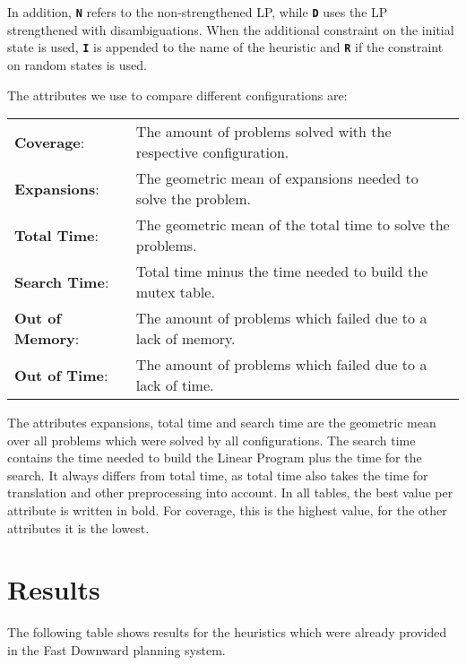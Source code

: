 In addition, \textbf{\texttt{N}} refers to the non-strengthened LP, while \textbf{\texttt{D}} uses the LP strengthened with disambiguations.
When the additional constraint on the initial state is used, \textbf{\texttt{I}} is appended to the name of the heuristic and \textbf{\texttt{R}} if the constraint on random states is used.

The attributes we use to compare different configurations are:

\begin{center}
    \begin{tabularx}{\textwidth}{@{}lX@{}}
        \textbf{Coverage}: & The amount of problems solved with the respective configuration. \\
        \textbf{Expansions}: & The geometric mean of expansions needed to solve the problem. \\
        \textbf{Total Time}: & The geometric mean of the total time to solve the problems. \\
        \textbf{Search Time}: & Total time minus the time needed to build the mutex table. \\
        \textbf{Out of Memory}: & The amount of problems which failed due to a lack of memory. \\
        \textbf{Out of Time}: & The amount of problems which failed due to a lack of time. \\
    \end{tabularx}
\end{center}

The attributes expansions, total time and search time are the geometric mean over all problems which were solved by all configurations.
The search time contains the time needed to build the Linear Program plus the time for the search.
It always differs from total time, as total time also takes the time for translation and other preprocessing into account.
In all tables, the best value per attribute is written in bold.
For coverage, this is the highest value, for the other attributes it is the lowest.

\section{Results}\label{sec:results}
The following table shows results for the heuristics which were already provided in the Fast Downward planning system.

